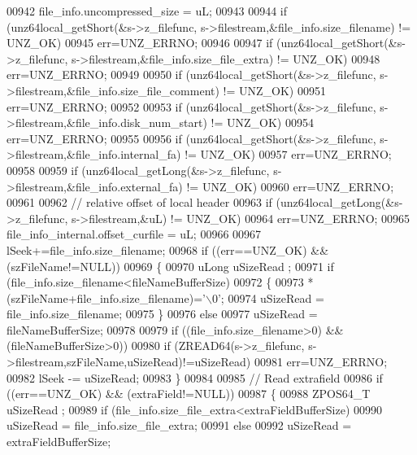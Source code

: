 \begin{DoxyCode}
00942     file\_info.uncompressed\_size = uL;
00943 
00944     \textcolor{keywordflow}{if} (unz64local\_getShort(&s->z\_filefunc, s->filestream,&file\_info.size\_filename) != UNZ\_OK)
00945         err=UNZ\_ERRNO;
00946 
00947     \textcolor{keywordflow}{if} (unz64local\_getShort(&s->z\_filefunc, s->filestream,&file\_info.size\_file\_extra) != UNZ\_OK)
00948         err=UNZ\_ERRNO;
00949 
00950     \textcolor{keywordflow}{if} (unz64local\_getShort(&s->z\_filefunc, s->filestream,&file\_info.size\_file\_comment) != UNZ\_OK)
00951         err=UNZ\_ERRNO;
00952 
00953     \textcolor{keywordflow}{if} (unz64local\_getShort(&s->z\_filefunc, s->filestream,&file\_info.disk\_num\_start) != UNZ\_OK)
00954         err=UNZ\_ERRNO;
00955 
00956     \textcolor{keywordflow}{if} (unz64local\_getShort(&s->z\_filefunc, s->filestream,&file\_info.internal\_fa) != UNZ\_OK)
00957         err=UNZ\_ERRNO;
00958 
00959     \textcolor{keywordflow}{if} (unz64local\_getLong(&s->z\_filefunc, s->filestream,&file\_info.external\_fa) != UNZ\_OK)
00960         err=UNZ\_ERRNO;
00961 
00962                 \textcolor{comment}{// relative offset of local header}
00963     \textcolor{keywordflow}{if} (unz64local\_getLong(&s->z\_filefunc, s->filestream,&uL) != UNZ\_OK)
00964         err=UNZ\_ERRNO;
00965     file\_info\_internal.offset\_curfile = uL;
00966 
00967     lSeek+=file\_info.size\_filename;
00968     \textcolor{keywordflow}{if} ((err==UNZ\_OK) && (szFileName!=NULL))
00969     \{
00970         uLong uSizeRead ;
00971         \textcolor{keywordflow}{if} (file\_info.size\_filename<fileNameBufferSize)
00972         \{
00973             *(szFileName+file\_info.size\_filename)=\textcolor{charliteral}{'\(\backslash\)0'};
00974             uSizeRead = file\_info.size\_filename;
00975         \}
00976         \textcolor{keywordflow}{else}
00977             uSizeRead = fileNameBufferSize;
00978 
00979         \textcolor{keywordflow}{if} ((file\_info.size\_filename>0) && (fileNameBufferSize>0))
00980             \textcolor{keywordflow}{if} (ZREAD64(s->z\_filefunc, s->filestream,szFileName,uSizeRead)!=uSizeRead)
00981                 err=UNZ\_ERRNO;
00982         lSeek -= uSizeRead;
00983     \}
00984 
00985     \textcolor{comment}{// Read extrafield}
00986     \textcolor{keywordflow}{if} ((err==UNZ\_OK) && (extraField!=NULL))
00987     \{
00988         ZPOS64\_T uSizeRead ;
00989         \textcolor{keywordflow}{if} (file\_info.size\_file\_extra<extraFieldBufferSize)
00990             uSizeRead = file\_info.size\_file\_extra;
00991         \textcolor{keywordflow}{else}
00992             uSizeRead = extraFieldBufferSize;

\end{DoxyCode}
